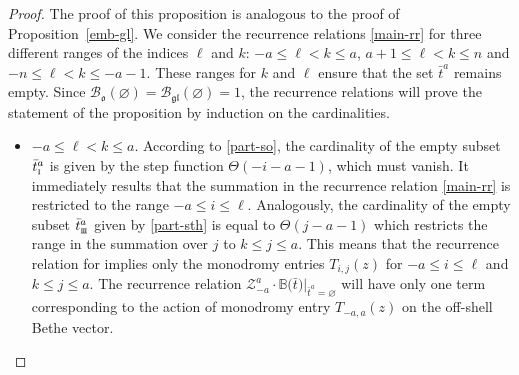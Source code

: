 \documentclass[pdftex]{sigma}
\newcommand{\so}{\scriptscriptstyle \rm I}
\newcommand{\sth}{\scriptscriptstyle \rm I\hspace{-1pt}I\hspace{-1pt}I}
\newcommand{\bt}{{\bar t}}
\theoremstyle{definition}
\def\BB{{\mathbb{B}}}
\def\r#1{\eqref{#1}}
\def\cBo{\mathcal{B}_{\mathfrak{o}}}
\def\cBg{\mathcal{B}_{\mathfrak{gl}}}
\def\Z{\mathcal{Z}}
\begin{document}
\begin{proof}
The proof of this proposition is analogous to the proof of Proposition~\ref{emb-gl}.
We consider the recurrence
relations \r{main-rr} for three different ranges of the indices $\ell$ and $k$:
$-a\leq \ell<k\leq a$, $a+1\leq \ell<k\leq n$ and $-n\leq \ell<k\leq -a-1$.
These ranges for $k$ and $\ell$ ensure that the set $\bt^a$ remains empty.
Since
$\cBo(\varnothing) = \cBg(\varnothing) = 1$, the recurrence relations will prove the statement of the proposition by induction on the cardinalities.
\begin{itemize}\itemsep=0pt
\item $-a\leq \ell<k\leq a$. According to \r{part-so}, the cardinality of the empty subset $\bt^a_{\so}$
is given by the step function
$\Theta(-i-a-1)$, which must vanish. It immediately results that the summation
in the recurrence relation \eqref{main-rr} is restricted to the range $-a\leq i\leq \ell$.
Analogously, the cardinality of the empty subset $\bt^a_{\sth}$ given by \r{part-sth}
is equal to $\Theta(j-a-1)$ which restricts the range in the summation
over $j$ to $k\leq j\leq a$. This means that the recurrence relation
for \smash{$\Z^k_\ell\cdot
\BB\bigl(\bt\bigr)|_{\bt^a=\varnothing}$}
implies only the monodromy entries $T_{i,j}(z)$ for $-a\leq i\leq \ell$ and
$k\leq j\leq a$. The recurrence relation $\Z^a_{-a}\cdot
\BB\bigl(\bt\bigr)|_{\bt^a=\varnothing}$ will have only one term corresponding to the action of
monodromy entry $T_{-a,a}(z)$ on the off-shell Bethe vector.


\end{itemize}
\end{proof}
\end{document}
